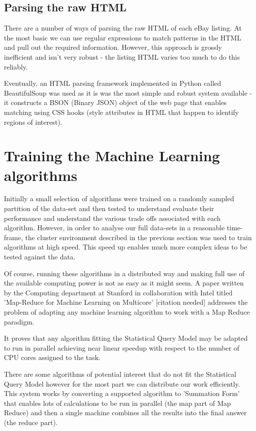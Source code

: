 \documentclass[12pt]{article}
\begin{document}
\subsection{Parsing the raw HTML}
There are a number of ways of parsing the raw HTML of each eBay listing. At the most basic we can use regular expressions to match patterns in the HTML and pull out the required information. However, this approach is grossly inefficient and isn't very robust - the listing HTML varies too much to do this reliably.

Eventually, an HTML parsing framework implemented in Python called BeautifulSoup was used as it is was the most simple and robust system available - it constructs a BSON (Binary JSON) object of the web page that enables matching using CSS hooks (style attributes in HTML that happen to identify regions of interest).


\newpage

\section{Training the Machine Learning algorithms}

Initially a small selection of algorithms were trained on a randomly sampled partition of the data-set and then tested to understand evaluate their performance and understand the various trade offs associated with each algorithm. 
However, in order to analyse our full data-sets in a reasonable time-frame, the cluster environment described in the previous section was used to train algorithms at high speed. This speed up enables much more complex ideas to be tested against the data.

Of course, running these algorithms in a distributed way and making full use of the available computing power is not as easy as it might seem. A paper written by the Computing department at Stanford in collaboration with Intel titled 'Map-Reduce for Machine Learning on Multicore' [citation needed] addresses the problem of adapting any machine learning algorithm to work with a Map Reduce paradigm.

It proves that any algorithm fitting the Statistical Query Model may be adapted to run in parallel achieving near linear speedup with respect to the number of CPU cores assigned to the task.

There are some algorithms of potential interest that do not fit the Statistical Query Model however for the most part we can distribute our work efficiently.
This system works by converting a supported algorithm to 'Summation Form' that enables lots of calculations to be run in parallel (the map part of Map Reduce) and then a single machine combines all the results into the final answer (the reduce part).
\end{document}
